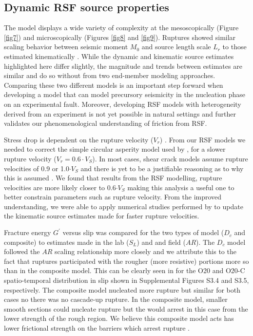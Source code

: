 \documentclass[preprint,1p, 10pt,authoryear]{elsarticle}
\begin{document}
\subsection{Dynamic RSF source properties}
The model displays a wide variety of complexity at the mesoscopically (Figure \ref{fig7}) and microscopically (Figures \ref{fig8} and \ref{fig9}). Ruptures showed similar scaling behavior between seismic moment $M_{0}$ and source length scale $L_{r}$  to those estimated kinematically \citet{Selvadurai2019}. While the dynamic and kinematic source estimates highlighted here differ slightly, the magnitude and trends between estimates are similar and do so without from two end-member modeling approaches. Comparing these two different models is an important step forward when developing a model that can model precursory seismicity in the nucleation phase on an experimental fault.  Moreover, developing RSF models with heterogeneity derived from an experiment is not yet possible in natural settings and further validates our phenomenological understanding of friction from RSF.

Stress drop is dependent on the rupture velocity ($V_{r}$) \citep{Kaneko2015}. From our RSF models we needed to correct the simple circular asperity model used by \citet{Selvadurai2019}, for a slower rupture velocity ($V_{r} = 0.6\cdot V_{S}$).  In most cases, shear crack models assume rupture velocities of 0.9 or 1.0$\cdot V_{S}$ and there is yet to be a justifiable reasoning as to why this is assumed \citep{Cocco2016, Selvadurai2019}. We found that results from the RSF modelling, rupture velocities are more likely closer to 0.6$\cdot V_{S}$ making this analysis a useful one to better constrain parameters such as rupture velocity. From the improved understanding, we were able to apply numerical studies performed by \citet{Kaneko2015} to update the kinematic source estimates made for faster rupture velocities.  

Fracture energy $G^{'}$ versus slip was compared for the two types of model ($D_{c}$ and composite) to estimates made  in the lab ($S_{L}$) and and field ($AR$). The $D_{c}$ model followed the $AR$ scaling relationship more closely and we attribute this to the fact that ruptures participated with the rougher (more resistive) portions more so than in the composite model. This can be clearly seen in for the O20 and O20-C spatio-temporal distribution in slip shown in Supplemental Figures S3.4 and S3.5, respectively.  The composite model nucleated more rupture but similar for both cases no there was no cascade-up rupture.  In the composite model, smaller smooth sections could nucleate rupture but the would arrest in this case from the lower strength of the rough region.  We believe this composite model acts has lower frictional strength on the barriers which arrest rupture \citep{Page2005}.  
\end{document}
